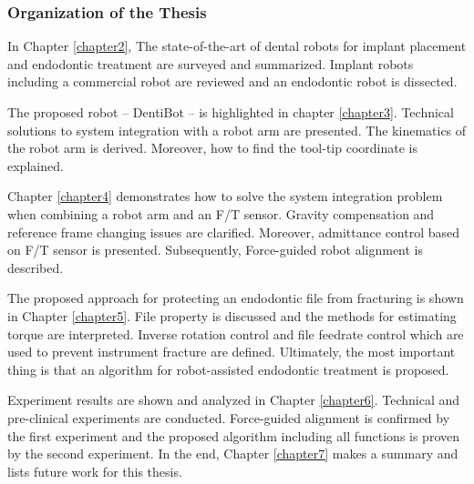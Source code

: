 \subsubsection{Organization of the Thesis}
\hspace*{6mm}In Chapter \ref{chapter2}, The state-of-the-art of dental robots for implant placement and endodontic treatment are surveyed and summarized. Implant robots including a commercial robot are reviewed and an endodontic robot is dissected. 
\par
The proposed robot -- DentiBot -- is highlighted in chapter \ref{chapter3}. Technical solutions to system integration with a robot arm are presented. The kinematics of the robot arm is derived. Moreover, how to find the tool-tip coordinate is explained.  
\par
Chapter \ref{chapter4} demonstrates how to solve the system integration problem when combining a robot arm and an F/T sensor. Gravity compensation and reference frame changing issues are clarified. Moreover, admittance control based on F/T sensor is presented. Subsequently, Force-guided robot alignment is described.  
\par
The proposed approach for protecting an endodontic file from fracturing is shown in Chapter \ref{chapter5}. File property is discussed and the methods for estimating torque are interpreted. Inverse rotation control and file feedrate control which are used to prevent instrument fracture are defined. Ultimately, the most important thing is that an algorithm for robot-assisted endodontic treatment is proposed.
\par
Experiment results are shown and analyzed in Chapter \ref{chapter6}. Technical and pre-clinical experiments are conducted. Force-guided alignment is confirmed by the first experiment and the proposed algorithm including all functions is proven by the second experiment.
In the end, Chapter \ref{chapter7} makes a summary and lists future work for this thesis.